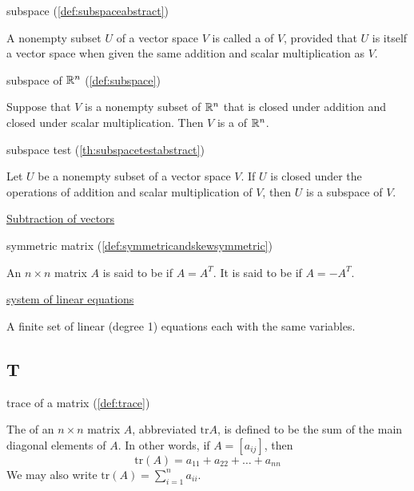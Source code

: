 \documentclass{ximera}
\begin{document}
subspace (\ref{def:subspaceabstract})
\begin{expandable}{}{}
    A nonempty subset $U$ of a vector space $V$ is called a  of $V$, provided that $U$ is itself a vector space when given the same addition and scalar multiplication as $V$.
\end{expandable}

subspace of $\mathbb{R}^n$ (\ref{def:subspace})
\begin{expandable}{}{}
    Suppose that $V$ is a nonempty subset of $\mathbb{R}^n$ that is closed under addition and closed under scalar multiplication.  Then $V$ is a  of $\mathbb{R}^n$.
\end{expandable}

subspace test (\ref{th:subspacetestabstract})
\begin{expandable}{}{}
    Let $U$ be a nonempty subset of a vector space $V$.  If $U$ is closed under the operations of addition and scalar multiplication of $V$, then $U$ is a subspace of $V$.
\end{expandable}

\href{https://ximera.osu.edu/linearalgebradzv3/LinearAlgebraInteractiveIntro/VEC-0030/main}{Subtraction of vectors}

symmetric matrix (\ref{def:symmetricandskewsymmetric})
\begin{expandable}{}{}
    An $n\times n$ matrix $A$ is said to be
 if $A=A^{T}.$ It is said to be
 if $A=-A^{T}.$
\end{expandable}

\href{https://ximera.osu.edu/linearalgebradzv3/LinearAlgebraInteractiveIntro/SYS-0010/main}{system of linear equations}
\begin{expandable}{}{}
    A finite set of linear (degree 1) equations each with the same variables.
\end{expandable}


\subsection*{T}

trace of a matrix (\ref{def:trace})
\begin{expandable}{}{}
    The  of an $n \times n$ matrix $A$, abbreviated $\mbox{tr} A$, is defined to be the sum of the main diagonal elements of $A$.  In other words, if $ A = [a_{ij}]$, then $$\mbox{tr}(A) = a_{11} + a_{22} + \dots + a_{nn}$$  We may also write $\mbox{tr}(A) =\sum_{i=1}^n a_{ii}$.
\end{expandable}
\end{document}
